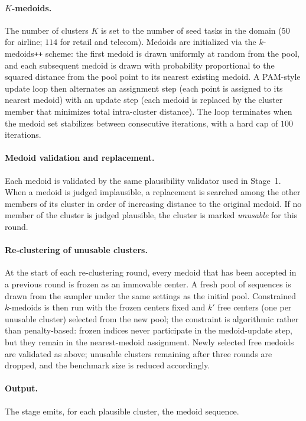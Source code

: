 \paragraph{$K$-medoids.}
The number of clusters $K$ is set to the number of seed tasks in the domain ($50$ for airline; $114$ for retail and telecom). Medoids are initialized via the $k$-medoids\texttt{++} scheme: the first medoid is drawn uniformly at random from the pool, and each subsequent medoid is drawn with probability proportional to the squared distance from the pool point to its nearest existing medoid. A PAM-style update loop then alternates an assignment step (each point is assigned to its nearest medoid) with an update step (each medoid is replaced by the cluster member that minimizes total intra-cluster distance). The loop terminates when the medoid set stabilizes between consecutive iterations, with a hard cap of $100$ iterations.

\paragraph{Medoid validation and replacement.}
Each medoid is validated by the same plausibility validator used in Stage~1. When a medoid is judged implausible, a replacement is searched among the other members of its cluster in order of increasing distance to the original medoid. If no member of the cluster is judged plausible, the cluster is marked \emph{unusable} for this round.

\paragraph{Re-clustering of unusable clusters.}
At the start of each re-clustering round, every medoid that has been accepted in a previous round is frozen as an immovable center. A fresh pool of sequences is drawn from the sampler under the same settings as the initial pool. Constrained $k$-medoids is then run with the frozen centers fixed and $k'$ free centers (one per unusable cluster) selected from the new pool; the constraint is algorithmic rather than penalty-based: frozen indices never participate in the medoid-update step, but they remain in the nearest-medoid assignment. Newly selected free medoids are validated as above; unusable clusters remaining after three rounds are dropped, and the benchmark size is reduced accordingly.

\paragraph{Output.}
The stage emits, for each plausible cluster, the medoid sequence.

